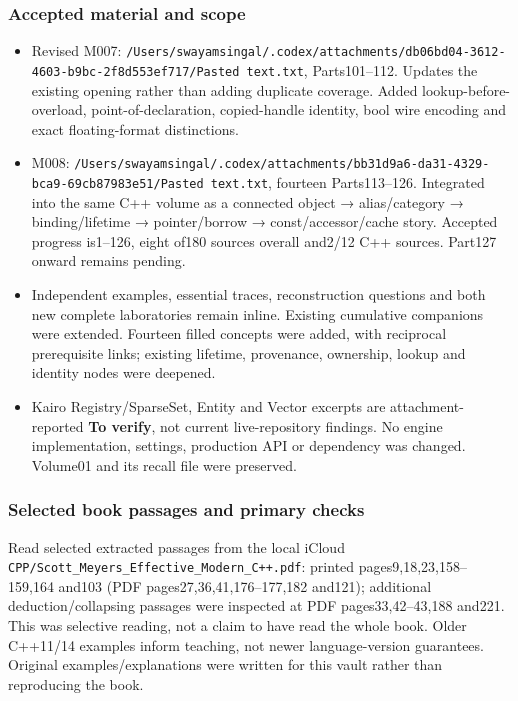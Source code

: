 \subsubsection{Accepted material and scope}\label{appendix-a103e7846d21-accepted-material-and-scope}

\begin{itemize}
\tightlist
\item
  Revised M007: \texttt{/Users/swayamsingal/.codex/attachments/db06bd04-3612-4603-b9bc-2f8d553ef717/Pasted\ text.txt}, Parts101--112. Updates the existing opening rather than adding duplicate coverage. Added lookup-before-overload, point-of-declaration, copied-handle identity, bool wire encoding and exact floating-format distinctions.
\item
  M008: \texttt{/Users/swayamsingal/.codex/attachments/bb31d9a6-da31-4329-bca9-69cb87983e51/Pasted\ text.txt}, fourteen Parts113--126. Integrated into the same C++ volume as a connected object → alias/category → binding/lifetime → pointer/borrow → const/accessor/cache story. Accepted progress is1--126, eight of180 sources overall and2/12 C++ sources. Part127 onward remains pending.
\item
  Independent examples, essential traces, reconstruction questions and both new complete laboratories remain inline. Existing cumulative companions were extended. Fourteen filled concepts were added, with reciprocal prerequisite links; existing lifetime, provenance, ownership, lookup and identity nodes were deepened.
\item
  Kairo Registry/SparseSet, Entity and Vector excerpts are attachment-reported \textbf{To verify}, not current live-repository findings. No engine implementation, settings, production API or dependency was changed. Volume01 and its recall file were preserved.
\end{itemize}

\subsubsection{Selected book passages and primary checks}\label{appendix-a103e7846d21-selected-book-passages-and-primary-checks}

Read selected extracted passages from the local iCloud \texttt{CPP/Scott\_Meyers\_Effective\_Modern\_C++.pdf}: printed pages9,18,23,158--159,164 and103 (PDF pages27,36,41,176--177,182 and121); additional deduction/collapsing passages were inspected at PDF pages33,42--43,188 and221. This was selective reading, not a claim to have read the whole book. Older C++11/14 examples inform teaching, not newer language-version guarantees. Original examples/explanations were written for this vault rather than reproducing the book.

